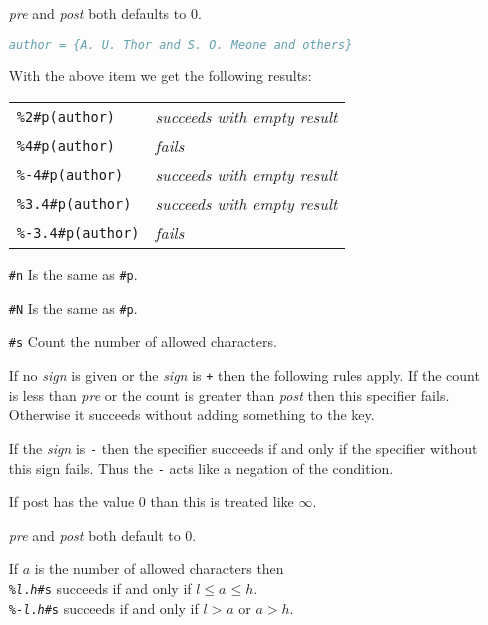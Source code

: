 \documentclass[11pt,a4paper]{scrbook}
\begin{document}
\begin{itemize}
    \textit{pre} and \textit{post} both defaults to 0.

    \begin{Example}
      \begin{lstlisting}[language=BibTeX]
  author = {A. U. Thor and S. O. Meone and others}
      \end{lstlisting}\vspace{-2ex}
      With the above item we get the following results:

      \begin{tabular}{ll}
        \texttt{\%2\#p(author)}		& \textit{succeeds with empty result}	\\
        \texttt{\%4\#p(author)}		& \textit{fails}	\\
        \texttt{\%-4\#p(author)}	& \textit{succeeds with empty result}	\\
        \texttt{\%3.4\#p(author)}	& \textit{succeeds with empty result}	\\
        \texttt{\%-3.4\#p(author)}	& \textit{fails}
      \end{tabular}
    \end{Example}
    
  \item [\texttt{\#n}] Is the same as \texttt{\#p}.

  \item [\texttt{\#N}] Is the same as \texttt{\#p}.

  \item [\texttt{\#s}] Count the number of allowed characters.

    If no \textit{sign} is given or the \textit{sign} is \verb|+| then the
    following rules apply. If the count is less than \textit{pre} or the count
    is greater than \textit{post} then this specifier fails. Otherwise it
    succeeds without adding something to the key.

    If the \textit{sign} is \verb|-| then the specifier succeeds if and only
    if the specifier without this sign fails. Thus the \verb|-| acts like a
    negation of the condition.

    If post has the value 0 than this is treated like \(\infty\).

    \textit{pre} and \textit{post} both default to 0.

    If \(a\) is the number of allowed characters then\\
    \texttt{\%\textit{l}.\textit{h}\#s} succeeds if and only if
    \(l\leq a\leq h\).\\
    \texttt{\%-\textit{l}.\textit{h}\#s} succeeds if and only if \(l>a\) or
    \(a>h\).


\end{itemize}
\end{document}
